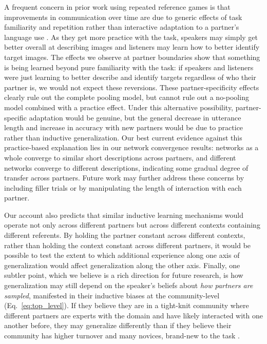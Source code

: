 A frequent concern in prior work using repeated reference games is that improvements in communication over time are due to generic effects of task familiarity and repetition rather than interactive adaptation to a partner's language use \cite{HupetChantraine92_CollaborationOrRepitition}. As they get more practice with the task, speakers may simply get better overall at describing images and listeners may learn how to better identify target images. The effects we observe at partner boundaries show that something is being learned beyond pure familiarity with the task: if speakers and listeners were just learning to better describe and identify targets regardless of who their partner is, we would not expect these reversions. These partner-specificity effects clearly rule out the complete pooling model, but cannot rule out a no-pooling model combined with a practice effect. Under this  alternative possibility, partner-specific adaptation would be genuine, but the general decrease in utterance length and increase in accuracy with new partners would be due to practice rather than inductive generalization.
Our best current evidence against this practice-based explanation lies in our network convergence results: networks as a whole converge to similar short descriptions across partners, and different networks converge to different descriptions, indicating some gradual degree of transfer across partners. 
Future work may further address these concerns by including filler trials or by manipulating the length of interaction with each partner.

Our account also predicts that similar inductive learning mechanisms would operate not only across different partners but across different contexts containing different referents. 
By holding the partner constant across different contexts, rather than holding the context constant across different partners, it would be possible to test the extent to which additional experience along one axis of generalization would affect generalization along the other axis. 
Finally, one subtler point, which we believe is a rich direction for future research, is how generalization may still depend on the speaker’s beliefs about \emph{how partners are sampled}, manifested in their inductive biases at the community-level (Eq.~\ref{eq:top_level}).
If they believe they are in a tight-knit community where different partners are experts with the domain and have likely interacted with one another before, they may generalize differently than if they believe their community has higher turnover and many novices, brand-new to the task \cite{isaacs_references_1987}.

